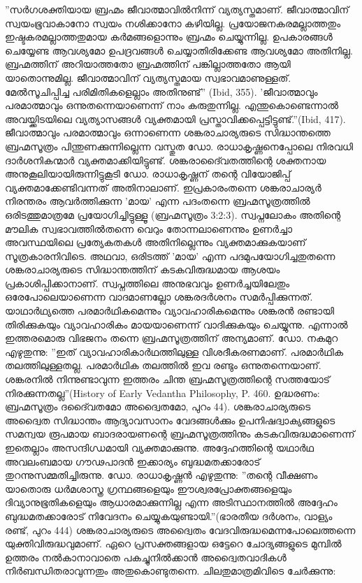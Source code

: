 ''സര്‍ഗശക്തിയായ ബ്രഹ്മം ജീവാത്മാവില്‍നിന്ന് വ്യത്യസ്തമാണ്. ജീവാത്മാവിന് സ്വയംഭൂവാകാനോ സ്വയം നശിക്കാനോ കഴിയില്ല. പ്രയോജനകരമല്ലാത്തതും ഇഷ്ടകരമല്ലാത്തതുമായ കര്‍മങ്ങളൊന്നും ബ്രഹ്മം ചെയ്യുന്നില്ല. ഉപകാരങ്ങള്‍ ചെയ്യേണ്ട ആവശ്യമോ ഉപദ്രവങ്ങള്‍ ചെയ്യാതിരിക്കേണ്ട ആവശ്യമോ അതിനില്ല. ബ്രഹ്മത്തിന് അറിയാത്തതോ ബ്രഹ്മത്തിന് പങ്കില്ലാത്തതോ ആയി യാതൊന്നുമില്ല. ജീവാത്മാവിന് വ്യത്യസ്തമായ സ്വഭാവമാണുള്ളത്. മേല്‍സൂചിപ്പിച്ച പരിമിതികളെല്ലാം അതിനുണ്ട്'' (Ibid, 355).
'ജീവാത്മാവും പരമാത്മാവും ഒന്നുതന്നെയാണെന്ന് നാം കരുതുന്നില്ല. എന്തുകൊണ്ടെന്നാല്‍ അവയ്ക്കിടയിലെ വ്യത്യാസങ്ങള്‍ വ്യക്തമായി പ്രസ്താവിക്കപ്പെട്ടിട്ടുണ്ട്.''(Ibid, 417).
ജീവാത്മാവും പരമാത്മാവും ഒന്നാണെന്ന ശങ്കരാചാര്യരുടെ സിദ്ധാന്തത്തെ ബ്രഹ്മസൂത്രം പിന്തുണക്കുന്നില്ലെന്ന വസ്തുത ഡോ. രാധാകൃഷ്ണനെപ്പോലെ നിരവധി ദാര്‍ശനികന്മാര്‍ വ്യക്തമാക്കിയിട്ടുണ്ട്. ശങ്കരാദൈ്വതത്തിന്റെ ശക്തനായ അനുകൂലിയായിരുന്നിട്ടുകൂടി ഡോ. രാധാകൃഷ്ണന് തന്റെ വിയോജിപ്പ് വ്യക്തമാക്കേണ്ടിവന്നത് അതിനാലാണ്. ഇപ്രകാരംതന്നെ ശങ്കരാചാര്യര്‍ നിരന്തരം ആവര്‍ത്തിക്കുന്ന 'മായ' എന്ന പദംതന്നെ ബ്രഹ്മസൂത്രത്തില്‍ ഒരിടത്തുമാത്രമേ പ്രയോഗിച്ചിട്ടുള്ളൂ (ബ്രഹ്മസൂത്രം 3:2:3). സ്വപ്നലോകം അതിന്റെ മൗലിക സ്വഭാവത്തില്‍തന്നെ വെറും തോന്നലാണെന്നും ഉണര്‍ച്ചാ അവസ്ഥയിലെ പ്രത്യേകതകള്‍ അതിനില്ലെന്നും വ്യക്തമാക്കുകയാണ് സൂത്രകാരനിവിടെ. അഥവാ, ഒരിടത്ത് 'മായ' എന്ന പദമുപയോഗിച്ചതുതന്നെ ശങ്കരാചാര്യരുടെ സിദ്ധാന്തത്തിന് കടകവിരുദ്ധമായ ആശയം പ്രകാശിപ്പിക്കാനാണ്. സ്വപ്നത്തിലെ അനുഭവവും ഉണര്‍ച്ചയിലേതും ഒരേപോലെയാണെന്ന വാദമാണല്ലോ ശങ്കരദര്‍ശനം സമര്‍പ്പിക്കുന്നത്.
യാഥാര്‍ഥ്യത്തെ പരമാര്‍ഥികമെന്നും വ്യാവഹാരികമെന്നും ശങ്കരന്‍ രണ്ടായി തിരിക്കുകയും വ്യാവഹാരികം മായയാണെന്ന് വാദിക്കുകയും ചെയ്യുന്നു. എന്നാല്‍ ഇത്തരമൊരു വിഭജനം തന്നെ ബ്രഹ്മസൂത്രത്തിന് അന്യമാണ്. ഡോ. നകമുറ എഴുതുന്നു: ''ഇത് വ്യാവഹാരികാര്‍ഥത്തിലുള്ള വിശദീകരണമാണ്. പരമാര്‍ഥിക തലത്തിലുള്ളതല്ല. പരമാര്‍ഥിക തലത്തില്‍ ഇവ രണ്ടും ഒന്നുതന്നെയാണ്. ശങ്കരനില്‍ നിന്നുണ്ടാവുന്ന ഇത്തരം ചിന്ത ബ്രഹ്മസൂത്രത്തിന്റെ സത്തയോട് നിരക്കുന്നതല്ല''(History of Early Vedantha Philosophy, P. 460. ഉദ്ധരണം: ബ്രഹ്മസൂത്രം ദദൈ്വതമോ അദ്വൈതമോ, പുറം 44).
ശങ്കരാചാര്യരുടെ അദ്വൈത സിദ്ധാന്തം ആദ്യാവസാനം വേദങ്ങള്‍ക്കും ഉപനിഷദ്വാക്യങ്ങളുടെ സമന്വയ രൂപമായ ബാദരായണന്റെ ബ്രഹ്മസൂത്രത്തിനും കടകവിരുദ്ധമാണെന്ന് ഇതെല്ലാം അസന്ദിഗ്ധമായി വ്യക്തമാക്കുന്നു. അദ്ദേഹത്തിന്റെ യഥാര്‍ഥ അവലംബമായ ഗൗഢപാദന്‍ ഇക്കാര്യം ബുദ്ധമതക്കാരോട് തുറന്നുസമ്മതിച്ചിരുന്നു. ഡോ. രാധാകൃഷ്ണന്‍ എഴുതുന്നു: ''തന്റെ വീക്ഷണം യാതൊരു ധര്‍മശാസ്ത്ര ഗ്രന്ഥങ്ങളെയും ഈശ്വരപ്രോക്തങ്ങളെയും ദിവ്യാനുഭൂതികളെയും ആധാരമാക്കുന്നില്ല എന്ന അടിസ്ഥാനത്തില്‍ അദ്ദേഹം ബുദ്ധമതക്കാരോട് നിവേദനം ചെയ്യുകയുണ്ടായി.''(ഭാരതീയ ദര്‍ശനം, വാള്യം രണ്ട്, പുറം 444)
ശങ്കരാചാര്യരുടെ അദ്വൈതം വേദവിരുദ്ധമെന്നപോലെത്തന്നെ യുക്തിവിരുദ്ധവുമാണ്. ഏറെ പ്രസക്തങ്ങളായ ഒട്ടേറെ ചോദ്യങ്ങളുടെ മുമ്പില്‍ ഉത്തരം നല്‍കാനാവാതെ പകച്ചുനില്‍ക്കാന്‍ അദ്വൈതവാദികള്‍ നിര്‍ബന്ധിതരാവുന്നതും അതുകൊണ്ടുതന്നെ. ചിലതുമാത്രമിവിടെ ചേര്‍ക്കുന്നു:

